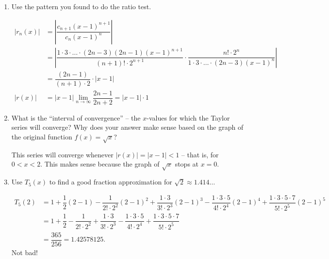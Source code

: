 \begin{enumerate}[leftmargin=0pt]
\begin{enumerate}
    \begin{red}
        In the numerator we have an alternator $(-1)^{k+1}$ and the product of odd numbers. (If you want to read about ``double factorials'' that may be fun!) In the denominator we have a factorial and a power of 2:
        \[c_k = (-1)^{k+1}\dfrac{1\cdot 3 \cdot \ldots \cdot (2k-3)}{k!\cdot 2^k}.\]
    \end{red}
    \item Use the pattern you found to do the ratio test.
    \begin{red}
    \begin{align*}
        |r_n(x)| &= \left| \dfrac{c_{n+1}(x-1)^{n+1}}{c_n (x-1)^n} \right| \\
        &= \left|
        \dfrac{1\cdot 3\cdot \ldots\cdot(2n-3)(2n-1) (x-1)^{n+1}}{(n+1)!\cdot 2^{n+1}} \cdot        
        \dfrac{n!\cdot 2^n}{1\cdot 3\cdot \ldots\cdot(2n-3) (x-1)^n}
        \right| \\
        &= \dfrac{(2n-1)}{(n+1)\cdot 2}\cdot |x-1| \\
        |r(x)| &= |x-1| \lim_{n\to \infty} \dfrac{2n-1}{2n+2} = |x-1|\cdot 1
    \end{align*}
    \end{red}
    
    \item What is the ``interval of convergence'' -- the $x$-values for which the Taylor series will converge? Why does your answer make sense based on the graph of the original function $f(x) = \sqrt{x}$?

    \begin{red}
        This series will converge whenever $|r(x)| = |x-1| < 1$ -- that is, for $0 < x < 2$. This makes sense because the graph of $\sqrt{x}$ stops at $x=0$.
    \end{red}
    \item Use $T_5(x)$ to find a good fraction approximation for $\sqrt{2} \approx 1.414\ldots$

    \begin{red}
        \begin{align*}
            T_5(2) &= 1 
        + \dfrac12 (2-1) 
        - \dfrac{1}{2!\cdot 2^2}(2-1)^2
        + \dfrac{1\cdot 3}{3!\cdot 2^3}(2-1)^3 
        - \dfrac{1\cdot3 \cdot 5}{4!\cdot 2^4}(2-1)^4
        + \dfrac{1\cdot3 \cdot 5\cdot 7}{5!\cdot 2^5}(2-1)^5 \\
        &= 1 
        + \dfrac12 
        - \dfrac{1}{2!\cdot 2^2}
        + \dfrac{1\cdot 3}{3!\cdot 2^3}
        - \dfrac{1\cdot3 \cdot 5}{4!\cdot 2^4}
        + \dfrac{1\cdot3 \cdot 5\cdot 7}{5!\cdot 2^5} \\
        &= \dfrac{365}{256} = 1.42578125.
        \end{align*}
        Not bad!
    \end{red}
\end{enumerate}

    

\end{enumerate}
